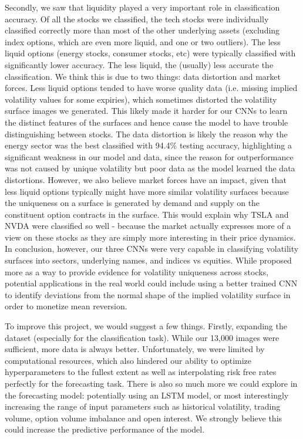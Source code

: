 \documentclass[10pt]{article}
\begin{document}
Secondly, we saw that liquidity played a very important role in classification accuracy. Of all the stocks we classified, the tech stocks were individually classified correctly more than most of the other underlying assets (excluding index options, which are even more liquid, and one or two outliers). The less liquid options (energy stocks, consumer stocks, etc) were typically classified with significantly lower accuracy. The less liquid, the (usually) less accurate the classification. We think this is due to two things: data distortion and market forces. Less liquid options tended to have worse quality data (i.e. missing implied volatility values for some expiries), which sometimes distorted the volatility surface images we generated. This likely made it harder for our CNNs to learn the distinct features of the surfaces and hence cause the model to have trouble distinguishing between stocks. The data distortion is likely the reason why the energy sector was the best classified with 94.4\% testing accuracy, highlighting a significant weakness in our model and data, since the reason for outperformance was not caused by unique volatility but poor data as the model learned the data distortions. However, we also believe market forces have an impact, given that less liquid options typically might have more similar volatility surfaces because the uniqueness on a surface is generated by demand and supply on the constituent option contracts in the surface. This would explain why TSLA and NVDA were classified so well - because the market actually expresses more of a view on these stocks as they are simply more interesting in their price dynamics. In conclusion, however, our three CNNs were very capable in classifying volatility surfaces into sectors, underlying names, and indices vs equities. While proposed more as a way to provide evidence for volatility uniqueness across stocks, potential applications in the real world could include using a better trained CNN to identify deviations from the normal shape of the implied volatility surface in order to monetize mean reversion.

To improve this project, we would suggest a few things. Firstly, expanding the dataset (especially for the classification task). While our 13,000 images were sufficient, more data is always better. Unfortunately, we were limited by computational resources, which also hindered our ability to optimize hyperparameters to the fullest extent as well as interpolating risk free rates perfectly for the forecasting task. There is also so much more we could explore in the forecasting model: potentially using an LSTM model, or most interestingly increasing the range of input parameters such as historical volatility, trading volume, option volume imbalance and open interest. We strongly believe this could increase the predictive performance of the model.
\end{document}
